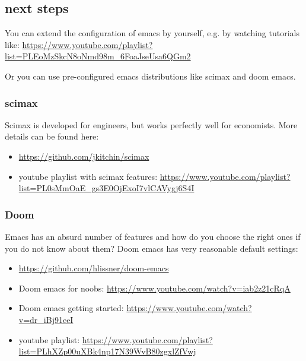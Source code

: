 \documentclass[11pt]{article}
\begin{document}
\subsection{next steps}

You can extend the configuration of emacs by yourself, e.g. by watching tutorials like: \url{https://www.youtube.com/playlist?list=PLEoMzSkcN8oNmd98m\_6FoaJseUsa6QGm2}

Or you can use pre-configured emacs distributions like scimax and doom emacs.


\subsubsection{scimax}

Scimax is developed for engineers, but works perfectly well for economists. More details can be found here:
\begin{itemize}
\item \url{https://github.com/jkitchin/scimax}
\item youtube playlist with scimax features: \url{https://www.youtube.com/playlist?list=PL0sMmOaE\_gs3E0OjExoI7vlCAVygj6S4I}
\end{itemize}

\subsubsection{Doom}

Emacs has an absurd number of features and how do you choose the right ones if you do not know about them? Doom emacs has very reasonable default settings:
\begin{itemize}
\item \url{https://github.com/hlissner/doom-emacs}
\item Doom emacs for noobs: \url{https://www.youtube.com/watch?v=iab2z21cRqA}
\item Doom emacs getting started: \url{https://www.youtube.com/watch?v=dr\_iBj91eeI}
\item youtube playlist: \url{https://www.youtube.com/playlist?list=PLhXZp00uXBk4np17N39WvB80zgxlZfVwj}
\end{itemize}
\end{document}
